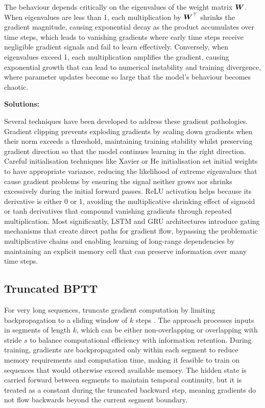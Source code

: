 The behaviour depends critically on the eigenvalues of the weight matrix $\boldsymbol{W}$. When eigenvalues are less than 1, each multiplication by $\boldsymbol{W}^\top$ shrinks the gradient magnitude, causing exponential decay as the product accumulates over time steps, which leads to vanishing gradients where early time steps receive negligible gradient signals and fail to learn effectively. Conversely, when eigenvalues exceed 1, each multiplication amplifies the gradient, causing exponential growth that can lead to numerical instability and training divergence, where parameter updates become so large that the model's behaviour becomes chaotic.

\textbf{Solutions:}

Several techniques have been developed to address these gradient pathologies. Gradient clipping prevents exploding gradients by scaling down gradients when their norm exceeds a threshold, maintaining training stability whilst preserving gradient direction so that the model continues learning in the right direction. Careful initialisation techniques like Xavier or He initialisation set initial weights to have appropriate variance, reducing the likelihood of extreme eigenvalues that cause gradient problems by ensuring the signal neither grows nor shrinks excessively during the initial forward passes. ReLU activation helps because its derivative is either 0 or 1, avoiding the multiplicative shrinking effect of sigmoid or tanh derivatives that compound vanishing gradients through repeated multiplication. Most significantly, LSTM and GRU architectures introduce gating mechanisms that create direct paths for gradient flow, bypassing the problematic multiplicative chains and enabling learning of long-range dependencies by maintaining an explicit memory cell that can preserve information over many time steps.

\subsection{Truncated BPTT}

For very long sequences, truncate gradient computation by limiting backpropagation to a sliding window of $k$ steps \cite{GoodfellowEtAl2016}. The approach processes inputs in segments of length $k$, which can be either non-overlapping or overlapping with stride $s$ to balance computational efficiency with information retention. During training, gradients are backpropagated only within each segment to reduce memory requirements and computation time, making it feasible to train on sequences that would otherwise exceed available memory. The hidden state is carried forward between segments to maintain temporal continuity, but it is treated as a constant during the truncated backward step, meaning gradients do not flow backwards beyond the current segment boundary.

